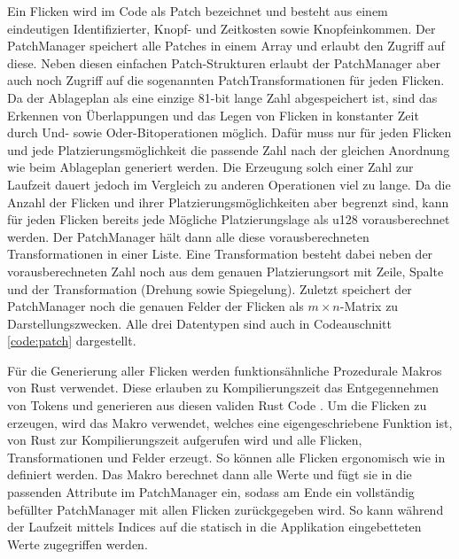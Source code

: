 Ein Flicken wird im Code als Patch bezeichnet und besteht aus einem eindeutigen Identifizierter, Knopf- und Zeitkosten sowie Knopfeinkommen. Der PatchManager speichert alle Patches in einem Array und erlaubt den Zugriff auf diese. Neben diesen einfachen Patch-Strukturen erlaubt der PatchManager aber auch noch Zugriff auf die sogenannten PatchTransformationen für jeden Flicken. Da der Ablageplan als eine einzige 81-bit lange Zahl abgespeichert ist, sind das Erkennen von Überlappungen und das Legen von Flicken in konstanter Zeit durch Und- sowie Oder-Bitoperationen möglich. Dafür muss nur für jeden Flicken und jede Platzierungsmöglichkeit die passende Zahl nach der gleichen Anordnung wie beim Ablageplan generiert werden. Die Erzeugung solch einer Zahl zur Laufzeit dauert jedoch im Vergleich zu anderen Operationen viel zu lange. Da die Anzahl der Flicken und ihrer Platzierungsmöglichkeiten aber begrenzt sind, kann für jeden Flicken bereits jede Mögliche Platzierungslage als \ac{u128} vorausberechnet werden. Der PatchManager hält dann alle diese vorausberechneten Transformationen in einer Liste. Eine Transformation besteht dabei neben der vorausberechneten Zahl noch aus dem genauen Platzierungsort mit Zeile, Spalte und der Transformation (Drehung sowie Spiegelung). Zuletzt speichert der PatchManager noch die genauen Felder der Flicken als $m\times n$-Matrix zu Darstellungszwecken. Alle drei Datentypen sind auch in Codeauschnitt \ref{code:patch} dargestellt.


\vspace*{-1cm}

Für die Generierung aller Flicken werden funktionsähnliche Prozedurale Makros von Rust verwendet. Diese erlauben zu Kompilierungszeit das Entgegennehmen von Tokens und generieren aus diesen validen Rust Code \cite[S. 673]{2023.RustBook}. Um die Flicken zu erzeugen, wird das Makro  verwendet, welches eine eigengeschriebene Funktion ist, von Rust zur Kompilierungszeit aufgerufen wird und alle Flicken, Transformationen und Felder erzeugt. So können alle Flicken ergonomisch wie in  definiert werden. Das Makro berechnet dann alle Werte und fügt sie in die passenden Attribute im PatchManager ein, sodass am Ende ein vollständig befüllter PatchManager mit allen Flicken zurückgegeben wird. So kann während der Laufzeit mittels Indices auf die statisch in die Applikation eingebetteten Werte zugegriffen werden.

